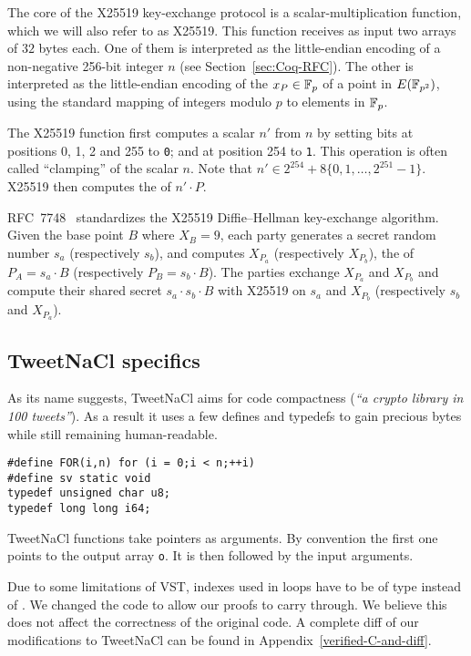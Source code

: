 The core of the X25519 key-exchange protocol is a scalar\hyp{}multiplication
function, which we will also refer to as X25519.
This function receives as input two arrays of $32$ bytes each.
One of them is interpreted as the little-endian encoding of a
non-negative 256-bit integer $n$ (see Section~\ref{sec:Coq-RFC}).
The other is interpreted as the little-endian encoding of
the \xcoord $x_P \in \mathbb{F}_{p}$ of a point in $E(\mathbb{F}_{p^2})$,
using the standard mapping of integers modulo $p$ to elements in $\mathbb{F}_{p}$.

The X25519 function first computes a scalar $n'$ from $n$ by setting
bits at positions 0, 1, 2 and 255 to \texttt{0}; and at position 254
to \texttt{1}.
This operation is often called ``clamping'' of the scalar $n$.
Note that $n' \in 2^{254} + 8\{0,1,\ldots,2^{251}-1\}$.
X25519 then computes the \xcoord of $n'\cdot P$.

RFC~7748~\cite{rfc7748} standardizes the X25519 Diffie–Hellman key-exchange algorithm.
Given the base point $B$ where $X_B=9$, each party generates a secret random number
$s_a$ (respectively $s_b$), and computes $X_{P_a}$ (respectively $X_{P_b}$), the
\xcoord of $P_A = s_a \cdot B$ (respectively $P_B = s_b \cdot B$).
The parties exchange $X_{P_a}$ and $X_{P_b}$ and compute their shared secret
$s_a \cdot  s_b \cdot B$ with
X25519 on $s_a$ and $X_{P_b}$ (respectively $s_b$ and $X_{P_a}$).


\subsection{TweetNaCl specifics}
\label{subsec:Number-TweetNaCl}

As its name suggests, TweetNaCl aims for code compactness (\emph{``a crypto library in 100 tweets''}).
As a result it uses a few defines and typedefs to gain precious bytes while
still remaining human-readable.
\begin{lstlisting}[language=Ctweetnacl,stepnumber=0]
#define FOR(i,n) for (i = 0;i < n;++i)
#define sv static void
typedef unsigned char u8;
typedef long long i64;
\end{lstlisting}

TweetNaCl functions take pointers as arguments. By convention the first one
points to the output array \texttt{o}. It is then followed by the input arguments.

Due to some limitations of VST, indexes used in  loops have to be
of type  instead of . We changed the code to allow our
proofs to carry through. We believe this does not affect the correctness of the
original code. A complete diff of our modifications to TweetNaCl can be found in
Appendix~\ref{verified-C-and-diff}.


